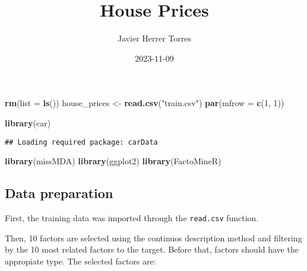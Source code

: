 \documentclass[
]{article}
\title{House Prices}
\author{Javier Herrer Torres}
\date{2023-11-09}
\newenvironment{Shaded}{\begin{snugshade}}{\end{snugshade}}
\newcommand{\AttributeTok}[1]{\textcolor[rgb]{0.13,0.29,0.53}{#1}}
\newcommand{\DecValTok}[1]{\textcolor[rgb]{0.00,0.00,0.81}{#1}}
\newcommand{\FunctionTok}[1]{\textcolor[rgb]{0.13,0.29,0.53}{\textbf{#1}}}
\newcommand{\NormalTok}[1]{#1}
\newcommand{\OtherTok}[1]{\textcolor[rgb]{0.56,0.35,0.01}{#1}}
\newcommand{\StringTok}[1]{\textcolor[rgb]{0.31,0.60,0.02}{#1}}
\begin{document}
\maketitle

{
\setcounter{tocdepth}{3}
\tableofcontents
}
\begin{Shaded}
\begin{Highlighting}[]
\FunctionTok{rm}\NormalTok{(}\AttributeTok{list =} \FunctionTok{ls}\NormalTok{())}
\NormalTok{house\_prices }\OtherTok{\textless{}{-}} \FunctionTok{read.csv}\NormalTok{(}\StringTok{"train.csv"}\NormalTok{)}
\FunctionTok{par}\NormalTok{(}\AttributeTok{mfrow =} \FunctionTok{c}\NormalTok{(}\DecValTok{1}\NormalTok{, }\DecValTok{1}\NormalTok{))}
\end{Highlighting}
\end{Shaded}

\begin{Shaded}
\begin{Highlighting}[]
\FunctionTok{library}\NormalTok{(car)}
\end{Highlighting}
\end{Shaded}

\begin{verbatim}
## Loading required package: carData
\end{verbatim}

\begin{Shaded}
\begin{Highlighting}[]
\FunctionTok{library}\NormalTok{(missMDA)}
\FunctionTok{library}\NormalTok{(ggplot2)}
\FunctionTok{library}\NormalTok{(FactoMineR)}
\end{Highlighting}
\end{Shaded}

\hypertarget{data-preparation}{%
\subsection{Data preparation}\label{data-preparation}}

First, the training data was imported through the \texttt{read.csv}
function.

Then, 10 factors are selected using the continuos description method and
filtering by the 10 most related factors to the target. Before that,
factors should have the appropiate type. The selected factors are:
\end{document}
